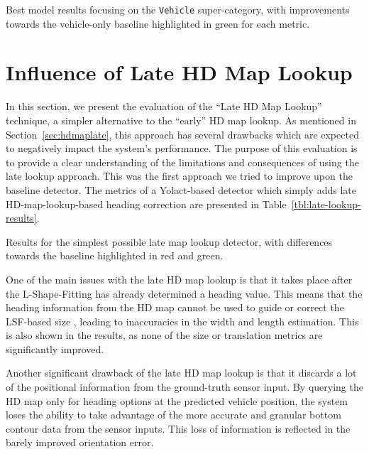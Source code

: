 \begin{table}[htbp]
    
    \caption{Best model results focusing on the \texttt{Vehicle} super-category, with improvements towards the vehicle-only baseline highlighted in green for each metric.}
    \label{tbl:best-vehicles}
\end{table}


\section{Influence of Late HD Map Lookup}
\label{sec:impactlatemap}

In this section, we present the evaluation of the \enquote{Late HD Map Lookup} technique, a simpler alternative to the \enquote{early} HD map lookup.
As mentioned in Section~\ref{sec:hdmaplate}, this approach has several drawbacks which are expected to negatively impact the system's performance.
The purpose of this evaluation is to provide a clear understanding of the limitations and consequences of using the late lookup approach.
This was the first approach we tried to improve upon the baseline detector.
The metrics of a Yolact-based detector which simply adds late HD-map-lookup-based heading correction are presented in Table~\ref{tbl:late-lookup-results}.

\begin{table}[htbp]
    
    \caption{Results for the simplest possible late map lookup detector, with differences towards the baseline highlighted in red and green.}
    \label{tbl:late-lookup-results}
\end{table}

One of the main issues with the late HD map lookup is that it takes place after the L-Shape-Fitting has already determined a heading value.
This means that the heading information from the HD map cannot be used to guide or correct the LSF-based size , leading to inaccuracies in the width and length estimation.
This is also shown in the results, as none of the size or translation metrics are significantly improved.

Another significant drawback of the late HD map lookup is that it discards a lot of the positional information from the ground-truth sensor input.
By querying the HD map only for heading options at the predicted vehicle position, the system loses the ability to take advantage of the more accurate and granular bottom contour data from the sensor inputs.
This loss of information is reflected in the barely improved orientation error.

